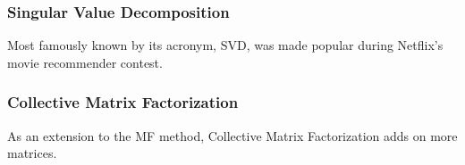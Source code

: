 \subsubsection{Singular Value Decomposition}
Most famously known by its acronym, SVD, was made popular during Netflix's movie recommender contest.


\subsubsection{Collective Matrix Factorization}
As an extension to the MF method, Collective Matrix Factorization adds on more matrices.
